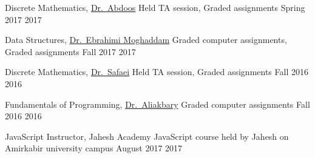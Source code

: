 \begin{cvhonors}

\cvhonor
{Discrete Mathematics, \href{http://facultymembers.sbu.ac.ir/abdoos/}{Dr.~Abdoos}} %
{Held TA session, Graded assignments} %
{Spring 2017} %
{2017}


\cvhonor
{Data Structures, \href{http://facultymembers.sbu.ac.ir/moghaddam/}{Dr.~Ebrahimi Moghaddam}} %
{Graded computer assignments, Graded assignments} %
{Fall 2017} %
{2017}


\cvhonor
{Discrete Mathematics, \href{http://facultymembers.sbu.ac.ir/safaei/}{Dr.~Safaei}} %
{Held TA session, Graded assignments} %
{Fall 2016} %
{2016}


\cvhonor
{Fundamentals of Programming, \href{http://facultymembers.sbu.ac.ir/aliakbary/}{Dr.~Aliakbary}} %
{Graded computer assignments} %
{Fall 2016} %
{2016}


\end{cvhonors}




\begin{cvhonors}


\cvhonor
{JavaScript Instructor, {Jahesh Academy}} %
{JavaScript course held by Jahesh on Amirkabir university campus} %
{August 2017} %
{2017}




\end{cvhonors}